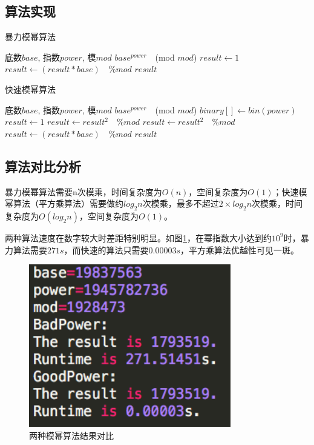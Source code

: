 \documentclass[11pt]{ctexart}
\begin{document}
\subsection{算法实现}
\begin{algorithm}  
    \caption{暴力模幂算法}  
    \begin{algorithmic}[1] %
        \Require 底数$base$, 指数$power$, 模$mod$  
        \Ensure $base^{power}\quad$(mod $mod$)  
            \State $result \gets 1$
                \State $result \gets (result * base)\quad\% mod$
            \EndFor
            \State \Return $result$
        \EndFunction  
    \end{algorithmic}  
\end{algorithm} 
\begin{algorithm}  
    \caption{快速模幂算法}  
    \begin{algorithmic}[1] %
        \Require 底数$base$, 指数$power$, 模$mod$  
        \Ensure $base^{power}\quad$(mod $mod$)  
            \State $binary[] \gets bin(power)$  
            \State $result \gets 1$
            		\State $result \gets result^2 \quad\% mod$
            	\Else
            		\State $result \gets result^2 \quad\% mod$
            		\State $result \gets (result * base) \quad\%mod$
            	\EndIf
            \EndFor
            \State \Return $result$
        \EndFunction  
    \end{algorithmic}  
\end{algorithm} 

\newpage{}
\subsection{算法对比分析}
暴力模幂算法需要n次模乘，时间复杂度为$O(n)$，空间复杂度为$O(1)$；快速模幂算法（平方乘算法）需要做约$log_{2}n$次模乘，最多不超过$2\times log_{2}n$次模乘，时间复杂度为$O(log_{2}n)$，空间复杂度为$O(1)$。

两种算法速度在数字较大时差距特别明显。如图\ref{img_power}，在幂指数大小达到约$10^9$时，暴力算法需要$271s$，而快速的算法只需要$0.00003s$，平方乘算法优越性可见一斑。
\begin{figure}[htbp]
\centering
\includegraphics[height=7.09cm,width=8.82cm]{power.png}
\caption{两种模幂算法结果对比}
\label{img_power}
\end{figure}
\end{document}
